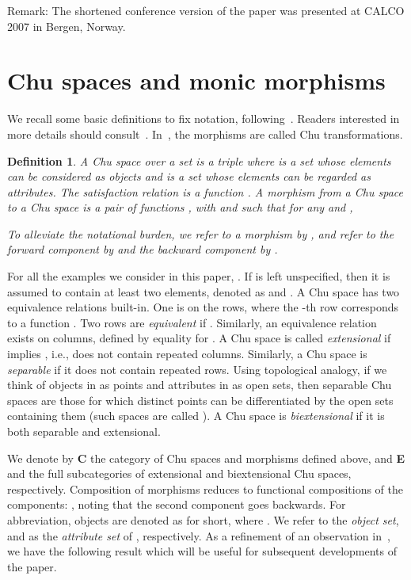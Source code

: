 \documentclass{LMCS}
\newtheorem{defn}{Definition}[section]
\begin{document}
Remark: The shortened conference version of the paper was presented at CALCO 2007 in Bergen, Norway.

\section{Chu spaces and monic morphisms}

\noindent We recall some basic definitions to fix notation,
following~\cite{pratt0}.  Readers interested in more details should
consult~\cite{pratt2}.  In~\cite{pratt2}, the morphisms are called Chu
transformations.

\begin{defn}
A Chu space over a set  is a triple 
where  is a set whose elements can be considered as {\em objects} and  is a set
whose elements can be regarded as {\em attributes}.
The satisfaction relation  is a
function .
A morphism   from a Chu space 
to a Chu space 
is a pair of functions , with
 and 
such that for any  and ,

To alleviate the notational burden, we refer to a morphism
by , and refer to the forward component by
 and the backward component by .
\end{defn}



For all the examples we consider in this paper, .
If  is left unspecified, then it is assumed to contain at least two
elements, denoted as  and .
A Chu space   has two equivalence relations built-in.
One is on the rows, where the -th row corresponds
to a function .
Two rows  are {\em equivalent} if . Similarly,
an equivalence relation exists on columns, defined by equality 
for .
A Chu space   is  called {\em extensional} if  implies ,
i.e.,  does not contain repeated columns. Similarly, a  Chu space 
is {\em separable} if it does not contain repeated rows. Using  topological
analogy, if we think of objects in  as points and attributes in  as open sets,
then separable Chu spaces are those for which distinct points can be differentiated by
the open sets containing them (such spaces are called ).
A Chu space is {\em biextensional} if it is
both separable and extensional.

We denote by {\bf C}  the category of Chu spaces and morphisms defined above, and {\bf E} and
 the full subcategories of extensional and biextensional  Chu spaces, respectively.
Composition of morphisms reduces to functional compositions of the components:
,
noting that the second component goes backwards.
For abbreviation, objects are denoted as  for short, where .
We refer to  the {\em object set}, and  as the {\em attribute set} of , respectively.
As a refinement of an observation in~\cite{lamarche}, we have the following
result which will be useful for subsequent developments of the paper.
\end{document}
